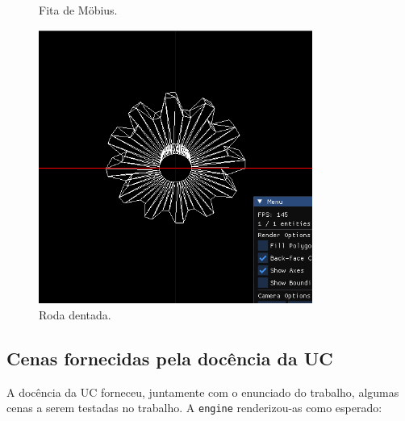 \documentclass[12pt, a4paper]{article}
\begin{document}
\begin{figure}[H]
\begin{minipage}{0.32\textwidth}
        \caption{Fita de Möbius.}
    \end{minipage}
    \begin{minipage}{0.32\textwidth}
        \centering
        \includegraphics[width=0.8\textwidth]{res/phase2/results/Gear.png}
        \caption{Roda dentada.}
    \end{minipage}\hfill
\end{figure}

\subsection{Cenas fornecidas pela docência da UC}

A docência da UC forneceu, juntamente com o enunciado do trabalho, algumas cenas a serem testadas no
trabalho. A \texttt{engine} renderizou-as como esperado:
\end{document}
